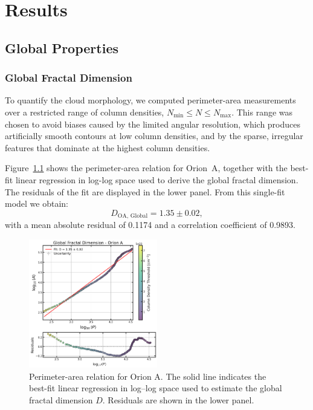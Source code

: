 \chapter{Results}
\label{ch:results}

\section{Global Properties}
\subsection{Global Fractal Dimension}

To quantify the cloud morphology, we computed perimeter-area measurements over a restricted range of column densities, \(N_\mathrm{min} \leq N \leq N_\mathrm{max}\). This range was chosen to avoid biases caused by the limited angular resolution, which produces artificially smooth contours at low column densities, and by the sparse, irregular features that dominate at the highest column densities.

Figure~\ref{fig:orion_A_global} shows the perimeter-area relation for Orion~A, together with the best-fit linear regression in log-log space used to derive the global fractal dimension. The residuals of the fit are displayed in the lower panel. From this single-fit model we obtain:
\[
D_{\mathrm{OA,\,Global}} = 1.35 \pm 0.02 ,
\]
with a mean absolute residual of 0.1174 and a correlation coefficient of 0.9893.

\begin{figure}[t]
    \centering
    \includegraphics[width=0.5\textwidth]{figures/orion_A_global.png}
    \caption{Perimeter-area relation for Orion A. The solid line indicates the best-fit linear regression in log--log space used to estimate the global fractal dimension \(D\). Residuals are shown in the lower panel.}
    \label{fig:orion_A_global}
\end{figure}

